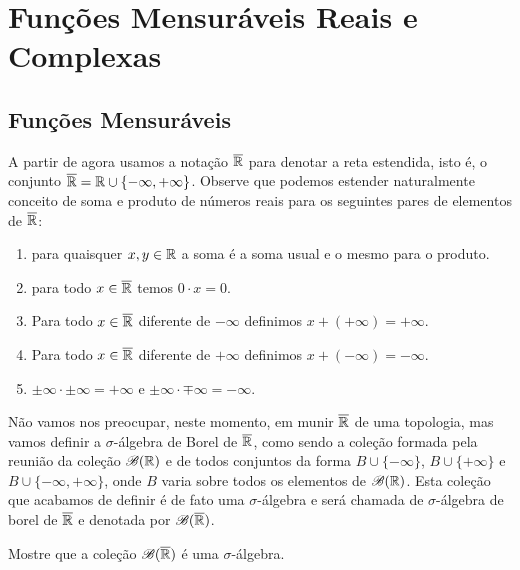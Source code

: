 \chapter[Aula 5]{Funções Mensuráveis Reais e Complexas}
\chaptermark{}

\section{Funções Mensuráveis}

A partir de agora usamos a notação $\overline{\mathbb{R}}$ 
para denotar a reta estendida, isto é, o conjunto
$\overline{\mathbb{R}} = \mathbb{R}\cup\{-\infty,+\infty\}$. 
Observe que podemos estender naturalmente conceito 
de soma e produto  de números reais
para os seguintes pares de elementos 
de $\overline{\mathbb{R}}$:
\begin{enumerate}
	\item 
	para quaisquer $x,y\in \mathbb{R}$ a soma é a soma usual 
	e o mesmo para o produto. 
	
	\item para todo $x\in \overline{\mathbb{R}}$ temos 
	$0\cdot x=0$.
	
	\item Para todo $x\in \overline{\mathbb{R}}$ diferente de 
	$-\infty$ definimos $x+(+\infty)=+\infty$.

	\item Para todo $x\in \overline{\mathbb{R}}$ diferente de 
	$+\infty$ definimos $x+(-\infty)=-\infty$.
	
	\item 
	$\pm \infty \cdot \pm \infty = +\infty$ 
	e
	$\pm \infty \cdot \mp \infty = -\infty$.
	
\end{enumerate}

Não vamos nos preocupar, neste momento, em munir $\overline{\mathbb{R}}$ 
de uma topologia, mas vamos definir a $\sigma$-álgebra
de Borel de $\overline{\mathbb{R}}$,
como sendo a coleção formada pela reunião da
coleção $\mathscr{B}(\mathbb{R})$ 
e de todos conjuntos da forma 
$B\cup\{-\infty\}$, $B\cup\{+\infty\}$ e $B\cup\{-\infty,+\infty\}$,
onde $B$ varia sobre todos os elementos de $\mathscr{B}(\mathbb{R})$.
Esta coleção que acabamos de definir
é de fato uma $\sigma$-álgebra e será chamada de $\sigma$-álgebra
de borel de $\overline{\mathbb{R}}$ e denotada por $\mathscr{B}(\overline{\mathbb{R}})$.

\begin{exercicio}
	Mostre que a coleção $\mathscr{B}(\overline{\mathbb{R}})$ 
	é uma $\sigma$-álgebra.
\end{exercicio}

